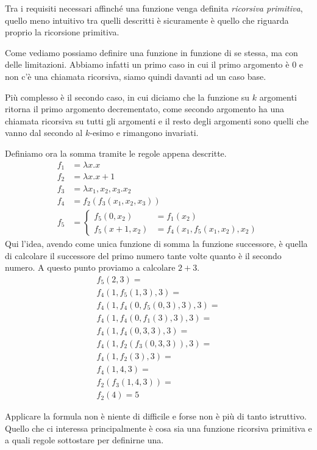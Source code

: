 Tra i requisiti necessari affinché una funzione venga definita
\emph{ricorsiva primitiva}, quello meno intuitivo tra quelli
descritti è sicuramente è quello che riguarda proprio la
ricorsione primitiva.

Come vediamo possiamo definire una funzione in funzione di se
stessa, ma con delle limitazioni. Abbiamo infatti un primo caso
in cui il primo argomento è $0$ e non c'è una chiamata
ricorsiva, siamo quindi davanti ad un caso base.

Più complesso è il secondo caso, in cui diciamo che la funzione
su $k$ argomenti ritorna il primo argomento decrementato, come
secondo argomento ha una chiamata ricorsiva su tutti gli
argomenti e il resto degli argomenti sono quelli che vanno dal
secondo al $k$-esimo e rimangono invariati.

\begin{example}
	Definiamo ora la somma tramite le regole appena descritte.
	\[
		\begin{array}{ll}
			f_1 & = \lambda x.x                    \\
			f_2 & = \lambda x.x + 1                \\
			f_3 & = \lambda x_1, x_2, x_3 . x_2    \\
			f_4 & = f_2 (f_3 (x_1, x_2, x_3))      \\
			f_5 & = \begin{cases}
				        f_5 (0, x_2)     & = f_1 (x_2) \\
				        f_5 (x + 1, x_2) & =
				        f_4 (x_1, f_5(x_1, x_2), x_2)
			        \end{cases}
		\end{array}
	\]
	Qui l'idea, avendo come unica funzione di somma la funzione
	successore, è quella di calcolare il successore del primo
	numero tante volte quanto è il secondo numero. A questo
	punto proviamo a calcolare $2 + 3$.
	\[
		\begin{array}{l}
			f_5(2, 3) =                         \\
			f_4 (1, f_5(1, 3), 3) =             \\
			f_4 (1, f_4(0, f_5 (0, 3), 3), 3) = \\
			f_4 (1, f_4(0, f_1 (3), 3), 3) =    \\
			f_4 (1, f_4(0, 3, 3), 3) =          \\
			f_4 (1, f_2(f_3(0, 3, 3)), 3) =     \\
			f_4 (1, f_2(3), 3) =                \\
			f_4 (1, 4, 3) =                     \\
			f_2 (f_3 (1, 4, 3)) =               \\
			f_2 (4) = 5
		\end{array}
	\]
\end{example}
Applicare la formula non è niente di difficile e forse
non è più di tanto istruttivo. Quello che ci interessa
principalmente è cosa sia una funzione ricorsiva primitiva e a
quali regole sottostare per definirne una.

